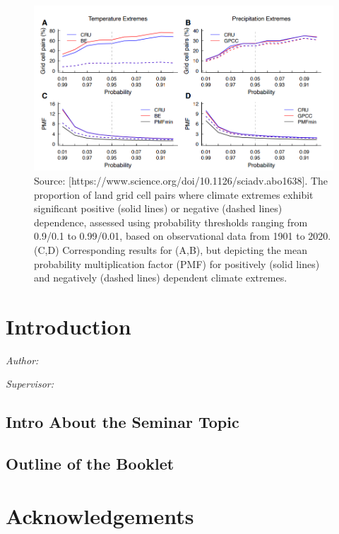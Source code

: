 \documentclass[
]{krantz}
\begin{document}
\vspace{1em}
\begin{figure}

{\centering \includegraphics[width=0.8\linewidth]{work/06-anthropo/figures/sensitivity} 

}

\caption{Source: [https://www.science.org/doi/10.1126/sciadv.abo1638]. The proportion of land grid cell pairs where climate extremes exhibit significant positive (solid lines) or negative (dashed lines) dependence, assessed using probability thresholds ranging from 0.9/0.1 to 0.99/0.01, based on observational data from 1901 to 2020. (C,D) Corresponding results for (A,B), but depicting the mean probability multiplication factor (PMF) for positively (solid lines) and negatively (dashed lines) dependent climate extremes.}\label{fig:unnamed-chunk-10}
\end{figure}
\vspace{1em}

\chapter{Introduction}\label{introduction-5}

\emph{Author: }

\emph{Supervisor: }

\section{Intro About the Seminar Topic}\label{intro-about-the-seminar-topic-3}

\section{Outline of the Booklet}\label{outline-of-the-booklet-3}

\chapter{Acknowledgements}\label{acknowledgements}
\end{document}
